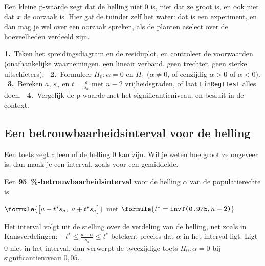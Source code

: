 Een kleine p-waarde zegt dat de helling niet 0 is, niet dat ze groot is, en ook niet dat $x$ de oorzaak is. Hier gaf de tuinder zelf het water: dat is een experiment, en dan mag je wel over een oorzaak spreken, als de planten aselect over de hoeveelheden verdeeld zijn.

\begin{werkwijze}
\textbf{1.}~Teken het spreidingsdiagram en de residuplot, en controleer de voorwaarden (onafhankelijke waarnemingen, een lineair verband, geen trechter, geen sterke uitschieters). \ \textbf{2.}~Formuleer $H_0\colon \alpha = 0$ en $H_1$ ($\alpha \neq 0$, of eenzijdig $\alpha > 0$ of $\alpha < 0$). \ \textbf{3.}~Bereken $a$, $s_a$ en $t = \frac{a}{s_a}$ met $n - 2$ vrijheidsgraden, of laat \texttt{LinRegTTest} alles doen. \ \textbf{4.}~Vergelijk de p-waarde met het significantieniveau, en besluit in de context.
\end{werkwijze}

\begin{oefeningen}
\end{oefeningen}

\subsection{Een betrouwbaarheidsinterval voor de helling}

Een toets zegt alleen of de helling 0 kan zijn. Wil je weten hoe groot ze ongeveer is, dan maak je een interval, zoals voor een gemiddelde.

\begin{theorie}
Een \textbf{\textcolor{accent}{95~\%-betrouwbaarheidsinterval}} voor de helling $\alpha$ van de populatierechte is

\vspace{1mm}
\qquad $\formule{\bigl[a - t^* s_a,\ a + t^* s_a\bigr]}$ \quad met \quad $\formule{t^* = \texttt{invT(0.975}, n - 2\texttt{)}}$
\end{theorie}

Het interval volgt uit de stelling over de verdeling van de helling, net zoals in Kansverdelingen: $-t^* \leqslant \frac{a - \alpha}{s_a} \leqslant t^*$ betekent precies dat $\alpha$ in het interval ligt. Ligt 0 niet in het interval, dan verwerpt de tweezijdige toets $H_0\colon \alpha = 0$ bij significantieniveau $0{,}05$.


